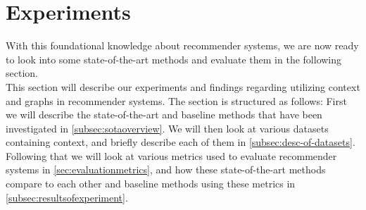 \section{Experiments}\label{sec:experiments}
With this foundational knowledge about recommender systems, we are now ready to look into some state-of-the-art methods and evaluate them in the following section.\\ 
This section will describe our experiments and findings regarding utilizing context and graphs in recommender systems.
The section is structured as follows: First we will describe the state-of-the-art and baseline methods that have been investigated in \autoref{subsec:sotaoverview}.
We will then look at various datasets containing context, and briefly describe each of them in \autoref{subsec:desc-of-datasets}.
Following that we will look at various metrics used to evaluate recommender systems in \autoref{sec:evaluationmetrics}, and how these state-of-the-art methods compare to each other and baseline methods using these metrics in \autoref{subsec:resultsofexperiment}.







